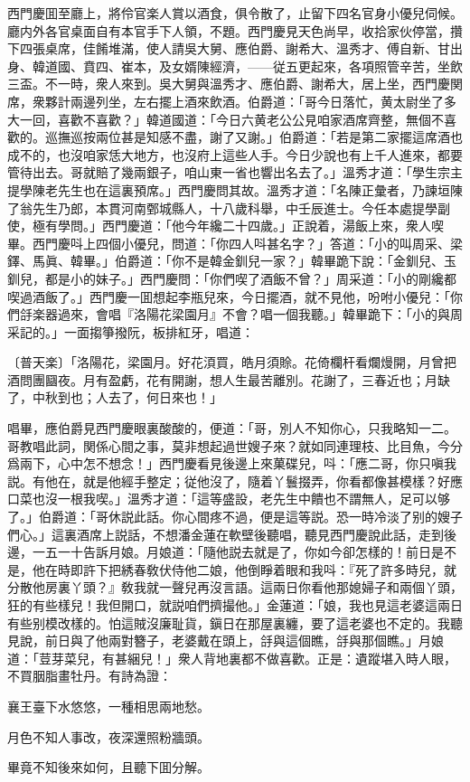 西門慶囬至廳上，將伶官楽人賞以酒食，俱令散了，止留下四名官身小優兒伺候。廳内外各官桌面自有本官手下人領，不題。西門慶見天色尚早，收拾家伙停當，攢下四張桌席，佳餚堆滿，使人請吳大舅、應伯爵、謝希大、溫秀才、傅自新、甘出身、韓道國、賁四、崔本，及女婿陳經濟，——従五更起來，各項照管辛苦，坐飲三盃。不一時，衆人來到。吳大舅與溫秀才、應伯爵、謝希大，居上坐，西門慶関席，衆夥計兩邊列坐，左右擺上酒來飲酒。伯爵道：「哥今日落忙，黄太尉坐了多大一回，喜歡不喜歡？」韓道國道：「今日六黄老公公見咱家酒席齊整，無個不喜歡的。巡撫巡按兩位甚是知感不盡，謝了又謝。」伯爵道：「若是第二家擺這席酒也成不的，也沒咱家恁大地方，也沒府上這些人手。今日少說也有上千人進來，都要管待出去。哥就賠了幾兩銀子，咱山東一省也響出名去了。」溫秀才道：「學生宗主提學陳老先生也在這裏預席。」西門慶問其故。溫秀才道：「名陳正彙者，乃諫垣陳了翁先生乃郎，本貫河南鄄城縣人，十八歲科舉，中壬辰進士。今任本處提學副使，極有學問。」西門慶道：「他今年纔二十四歲。」正說着，湯飯上來，衆人喫畢。西門慶呌上四個小優兒，問道：「你四人呌甚名字？」答道：「小的叫周采、梁鐸、馬眞、韓畢。」伯爵道：「你不是韓金釧兒一家？」韓畢跪下說：「金釧兒、玉釧兒，都是小的妹子。」西門慶問：「你們喫了酒飯不曾？」周采道：「小的剛纔都喫過酒飯了。」西門慶一囬想起李瓶兒來，今日擺酒，就不見他，吩咐小優兒：「你們㧱楽器過來，會唱『洛陽花梁園月』不會？唱一個我聽。」韓畢跪下：「小的與周采記的。」一面搊箏撥阮，板排紅牙，唱道：

\begin{myquote}
{\markfont〔普天楽〕}「洛陽花，梁園月。好花湏買，皓月須賒。花倚欄杆看爛熳開，月曾把酒問團圝夜。月有盈虧，花有開謝，想人生最苦離別。花謝了，三春近也；月缺了，中秋到也；人去了，何日來也！」
\end{myquote}

唱畢，應伯爵見西門慶眼裏酸酸的，便道：「哥，別人不知你心，只我略知一二。哥教唱此詞，関係心間之事，莫非想起過世嫂子來？就如同連理枝、比目魚，今分爲兩下，心中怎不想念！」西門慶看見後邊上來菓碟兒，呌：「應二哥，你只嗔我説。有他在，就是他經手整定；従他沒了，隨着丫鬟掇弄，你看都像甚模樣？好應口菜也沒一根我喫。」溫秀才道：「這等盛設，老先生中饋也不謂無人，足可以够了。」伯爵道：「哥休説此話。你心間疼不過，便是這等説。恐一時冷淡了别的嫂子們心。」這裏酒席上説話，不想潘金蓮在軟壁後聽唱，聽見西門慶說此話，走到後邊，一五一十告訴月娘。月娘道：「隨他説去就是了，你如今卻怎樣的！前日是不是，他在時即許下把綉春敎伏侍他二娘，他倒睜着眼和我呌：『死了許多時兒，就分散他房裏丫頭？』敎我就一聲兒再沒言語。這兩日你看他那媳婦子和兩個丫頭，狂的有些樣兒！我但開口，就説咱們擠撮他。」金蓮道：「娘，我也見這老婆這兩日有些别模改樣的。怕這賊沒廉耻貨，鎭日在那屋裏纏，要了這老婆也不定的。我聽見說，前日與了他兩對簪子，老婆戴在頭上，㧱與這個瞧，㧱與那個瞧。」月娘道：「荳芽菜兒，有甚綑兒！」衆人背地裏都不做喜歡。正是：遺蹤堪入時人眼，不買胭脂畫牡丹。有詩為證：

\begin{myquote}
襄王臺下水悠悠，一種相思兩地愁。

月色不知人事改，夜深還照粉牆頭。
\end{myquote}

畢竟不知後來如何，且聽下囬分解。

